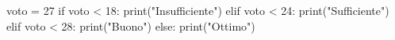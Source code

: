 \begin{unipdcode}[language=Python]
voto = 27
if voto < 18:
    print("Insufficiente")
elif voto < 24:
    print("Sufficiente")
elif voto < 28:
    print("Buono")
else:
    print("Ottimo")
\end{unipdcode}
